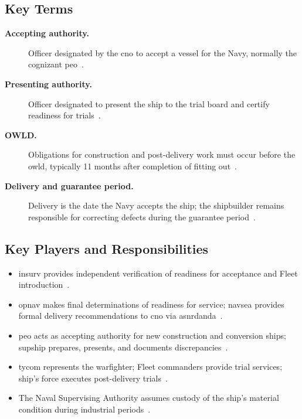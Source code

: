 \documentclass[../main.tex]{subfiles}
\begin{document}
\subsection{Key Terms}
\begin{description}
  \item[\textbf{Accepting authority.}] Officer designated by the \ac{cno} to accept a vessel for the Navy, normally the cognizant \ac{peo}~\autocite{edo-3-5-7-ship-trials-2025}.
  \item[\textbf{Presenting authority.}] Officer designated to present the ship to the trial board and certify readiness for trials~\autocite{edo-3-5-7-ship-trials-2025}.
  \item[\textbf{OWLD.}] Obligations for construction and post-delivery work must occur before the \ac{owld}, typically 11 months after completion of fitting out~\autocite{edo-3-5-7-ship-trials-2025}.
  \item[\textbf{Delivery and guarantee period.}] Delivery is the date the Navy accepts the ship; the shipbuilder remains responsible for correcting defects during the guarantee period~\autocite{edo-3-5-7-ship-trials-2025}.
\end{description}

\subsection{Key Players and Responsibilities}
\begin{itemize}
  \item \ac{insurv} provides independent verification of readiness for acceptance and Fleet introduction~\autocite{edo-3-5-7-ship-trials-2025}.
  \item \ac{opnav} makes final determinations of readiness for service; \ac{navsea} provides formal delivery recommendations to \ac{cno} via \ac{asnrdanda}~\autocite{edo-3-5-7-ship-trials-2025}.
  \item \ac{peo} acts as accepting authority for new construction and conversion ships; \ac{supship} prepares, presents, and documents discrepancies~\autocite{edo-3-5-7-ship-trials-2025}.
  \item \ac{tycom} represents the warfighter; Fleet commanders provide trial services; ship's force executes post-delivery trials~\autocite{edo-3-5-7-ship-trials-2025}.
  \item The Naval Supervising Authority assumes custody of the ship's material condition during industrial periods~\autocite{edo-3-5-7-ship-trials-2025}.
\end{itemize}
\end{document}
